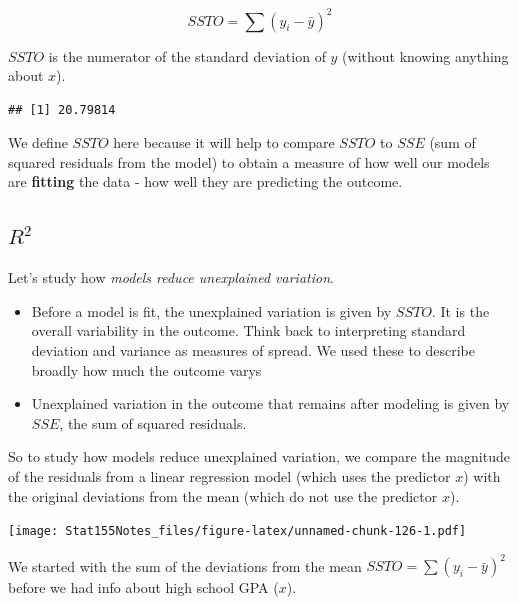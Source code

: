 \documentclass[]{book}
\newenvironment{Shaded}{\begin{snugshade}}{\end{snugshade}}
\newcommand{\DataTypeTok}[1]{\textcolor[rgb]{0.13,0.29,0.53}{#1}}
\newcommand{\DecValTok}[1]{\textcolor[rgb]{0.00,0.00,0.81}{#1}}
\newcommand{\KeywordTok}[1]{\textcolor[rgb]{0.13,0.29,0.53}{\textbf{#1}}}
\newcommand{\NormalTok}[1]{#1}
\newcommand{\OperatorTok}[1]{\textcolor[rgb]{0.81,0.36,0.00}{\textbf{#1}}}
\newcommand{\StringTok}[1]{\textcolor[rgb]{0.31,0.60,0.02}{#1}}
\providecommand{\tightlist}{%
  \setlength{\itemsep}{0pt}\setlength{\parskip}{0pt}}
\begin{document}
\[ SSTO = \sum{(y_i -\bar{y})^2} \]

\(SSTO\) is the numerator of the standard deviation of \(y\) (without knowing anything about \(x\)).

\begin{Shaded}
\end{Shaded}

\begin{verbatim}
## [1] 20.79814
\end{verbatim}

We define \(SSTO\) here because it will help to compare \(SSTO\) to \(SSE\) (sum of squared residuals from the model) to obtain a measure of how well our models are \textbf{fitting} the data - how well they are predicting the outcome.

\hypertarget{r2}{%
\subsection{\texorpdfstring{\(R^2\)}{R\^{}2}}\label{r2}}

Let's study how \emph{models reduce unexplained variation}.

\begin{itemize}
\tightlist
\item
  Before a model is fit, the unexplained variation is given by \(SSTO\). It is the overall variability in the outcome. Think back to interpreting standard deviation and variance as measures of spread. We used these to describe broadly how much the outcome varys
\item
  Unexplained variation in the outcome that remains after modeling is given by \(SSE\), the sum of squared residuals.
\end{itemize}

So to study how models reduce unexplained variation, we compare the magnitude of the residuals from a linear regression model (which uses the predictor \(x\)) with the original deviations from the mean (which do not use the predictor \(x\)).

\texttt{[image: Stat155Notes\_files/figure-latex/unnamed-chunk-126-1.pdf]}

We started with the sum of the deviations from the mean \(SSTO = \sum{(y_i - \bar{y})^2}\) before we had info about high school GPA (\(x\)).
\end{document}
